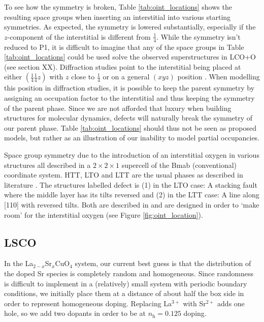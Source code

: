 To see how the symmetry is broken, Table \ref{tab:oint_locations} shows the resulting space groups when inserting an interstitial into various starting symmetries. As expected, the symmetry is lowered substantially, especially if the $z$-component of the interstitial is different from $\frac{1}{4}$. While the symmetry isn't reduced to P1, it is difficult to imagine that any of the space groups in Table \ref{tab:oint_locations} could be used solve the observed superstructures in LCO+O (see section XX). Diffraction studies point to the interstitial being placed at either $\left(\frac{1}{4}  \frac{1}{4} z \right)$ with $z$ close to $\frac{1}{4}$ or on a general $(xyz)$ position \cite{Rial1997}. When modelling this position in diffraction studies, it is possible to keep the parent symmetry by assigning an occupation factor to the interstitial and thus keeping the symmetry of the parent phase. Since we are not afforded that luxury when building structures for molecular dynamics, defects will naturally break the symmetry of our parent phase. Table \ref{tab:oint_locations} should thus not be seen as proposed models, but rather as an illustration of our inability to model partial occupancies.

\begin{table}
	\centering
	\caption[Oxygen interstitial phases]{Space group symmetry due to the introduction of an interstitial oxygen in various structures all described in a $2 \times 2 \times 1$ supercell of the Bmab (conventional) coordinate system. HTT, LTO and LTT are the usual phases as described in literature \cite{Hucker2012}. The structures labelled defect is (1) in the LTO case: A stacking fault where the middle layer has its tilts reversed and (2) in the LTT case: A line along [110] with reversed tilts. Both are described in \cite{Tranquada1994} and are designed in order to `make room' for the interstitial oxygen (see Figure \ref{fig:oint_location}).}
    \label{tab:oint_locations}
    
\end{table}

\subsection{LSCO}
In the La$_{2-x}$Sr$_x$CuO$_4$ system, our current best guess is that the distribution of the doped Sr species is completely random and homogeneous. Since randomness is difficult to implement in a (relatively) small system with periodic boundary conditions, we initially place them at a distance of about half the box side in order to  represent homogeneous doping. Replacing La$^{3+}$ with Sr$^{2+}$ adds one hole, so we add two dopants in order to be at $n_\text{h} = 0.125$ doping.


